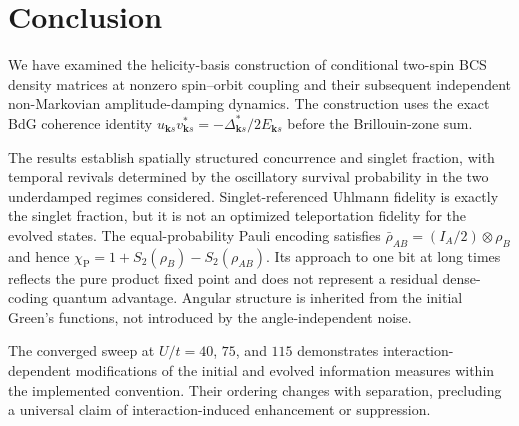 \documentclass[aps,prb,twocolumn,superscriptaddress,longbibliography]{revtex4-2}
\begin{document}
\section{Conclusion}

We have examined the helicity-basis construction of conditional two-spin
BCS density matrices at nonzero spin--orbit coupling and their subsequent
independent non-Markovian amplitude-damping dynamics. The construction uses
the exact BdG coherence identity
$u_{\mathbf ks}v_{\mathbf ks}^*=-\Delta_{\mathbf ks}^*/2E_{\mathbf ks}$
before the Brillouin-zone sum.

The results establish spatially structured concurrence and singlet
fraction, with temporal revivals determined by the oscillatory survival
probability in the two underdamped regimes considered. Singlet-referenced
Uhlmann fidelity is exactly the singlet fraction, but it is not an optimized
teleportation fidelity for the evolved states. The equal-probability Pauli
encoding satisfies $\bar\rho_{AB}=(I_A/2)\otimes\rho_B$ and hence
$\chi_{\mathrm P}=1+S_2(\rho_B)-S_2(\rho_{AB})$. Its approach to one bit at
long times reflects the pure product fixed point and does not represent a
residual dense-coding quantum advantage. Angular structure is inherited from
the initial Green's functions, not introduced by the angle-independent noise.

The converged sweep at $U/t=40$, $75$, and $115$ demonstrates
interaction-dependent modifications of the initial and evolved information
measures within the implemented convention. Their ordering changes with
separation, precluding a universal claim of interaction-induced enhancement or
suppression.
\end{document}
